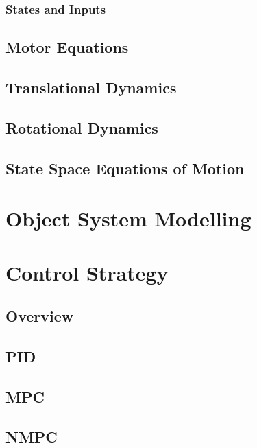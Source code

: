 \documentclass{UoNMCHA}
\numberwithin{equation}{section}
\begin{document}
\subsubsection{States and Inputs}
\subsection{Motor Equations}
\subsection{Translational Dynamics}
\subsection{Rotational Dynamics}
\subsection{State Space Equations of Motion}

\section{Object System Modelling}

\section{Control Strategy}
\subsection{Overview}
\subsection{PID}
\subsection{MPC}
\subsection{NMPC}
\end{document}
